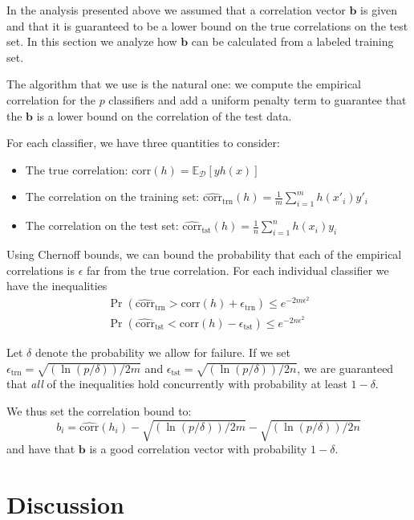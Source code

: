\documentclass{colt2015} %
\newcommand{\corr}{\mbox{corr}}
\newcommand{\vb}{\mathbf{b}}
\DeclareMathOperator{\Prtxt}{Pr}
\newcommand{\evp}[2]{\mathbb{E}_{#2} \left[#1\right]} %
\newcommand{\pr}[1]{\Prtxt \left(#1\right)}
\newcommand{\cD}{\mathcal{D}}
\begin{document}
In the analysis presented above we assumed that a correlation vector
$\vb$ is given and that it is guaranteed to be a lower bound  on the
true correlations on the test set. In this section we analyze how
$\vb$ can be calculated from a labeled training set.

The algorithm that we use is the natural one: we compute the empirical
correlation for the $p$ classifiers and add a uniform penalty term to guarantee
that the $\vb$ is a lower bound on the correlation of the test data.

For each classifier, we have three quantities to consider:
\begin{itemize}
\item The true correlation: $\corr(h) = \evp{y h(x)}{\cD}$
\item The correlation on the training set: $\widehat{\corr}_{\mbox{trn}}(h) =
  \frac{1}{m} \sum_{i=1}^m h(x'_i)y'_i$
\item The correlation on the test set: $\widehat{\corr}_{\mbox{tst}}(h) =
  \frac{1}{n} \sum_{i=1}^n h(x_i)y_i$
\end{itemize}
Using Chernoff bounds, we can bound the probability that each of the empirical
correlations is $\epsilon$ far from the true correlation. For each
individual classifier we have the inequalities 
\begin{eqnarray*}
\pr{\widehat{\corr}_{\mbox{trn}} > \corr(h)+\epsilon_{\mbox{trn}}} \leq e^{-2m \epsilon^2} \\
\pr{\widehat{\corr}_{\mbox{tst}} < \corr(h)-\epsilon_{\mbox{tst}}} \leq e^{-2n \epsilon^2} 
\end{eqnarray*}

Let $\delta$ denote the probability we allow for failure. If we set 
$\epsilon_{\mbox{trn}}=\sqrt{(\ln(p/\delta))/2m}$ and
$\epsilon_{\mbox{tst}}=\sqrt{(\ln(p/\delta))/2n}$, we are guaranteed that {\em
  all} of the inequalities hold concurrently with probability at
least $1-\delta$.

We thus set the correlation bound to:
\[
b_i=\widehat{\corr}(h_i)-\sqrt{(\ln(p/\delta))/2m}-\sqrt{(\ln(p/\delta))/2n}
\]
and have that $\vb$ is a good correlation vector with probability $1-\delta$.



\section{Discussion}
\label{sec:discthmpred}
\end{document}

